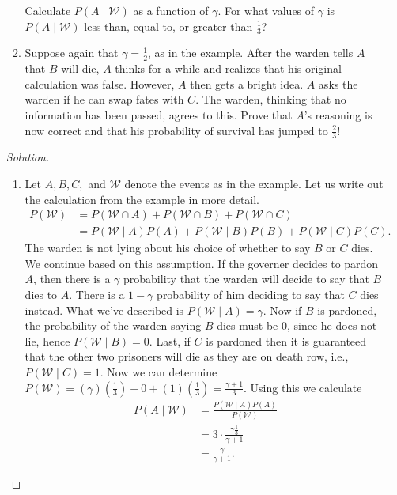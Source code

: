 \documentclass[12pt]{article}
\theoremstyle{definition}
\theoremstyle{plain}
\newenvironment{solution}
  {\begin{proof}[Solution]}
  {\end{proof}}
\begin{document}
\begin{enumerate}
\begin{enumerate}
	Calculate $ P(A \mid \mathcal{W}) $ as a function of $ \gamma $. For what values of $ \gamma$ is $ P(A \mid \mathcal{W}) $ less than, equal to, or greater than $ \frac{1}{3} $?
	
	\item Suppose again that $ \gamma = \frac{1}{2} $, as in the example. After the warden tells $ A $ that $ B $ will die, $ A $ thinks for a while and realizes that his original calculation was false. However, $ A $ then gets a bright idea. $ A $ asks the warden if he can swap fates with $ C $. The warden, thinking that no information has been passed, agrees to this. Prove that $ A $'s reasoning is now correct and that his probability of survival has jumped to $ \frac{2}{3} $!
	\end{enumerate}
	
\begin{solution}
\begin{enumerate}
\item Let $ A, B, C, $ and $ \mathcal{W} $ denote the events as in the example. Let us write out the calculation from the example in more detail.
\begin{align*}
	P(\mathcal{W}) &= P(\mathcal{W} \cap A) + P(\mathcal{W} \cap B) + P(\mathcal{W} \cap C)\\
	&= P(\mathcal{W} \mid A)P(A) + P(\mathcal{W}\mid B) P(B) + P(\mathcal{W} \mid C)P(C).
\end{align*}
The warden is not lying about his choice of whether to say $ B $ or $ C $ dies. We continue based on this assumption. If the governer decides to pardon $ A $, then there is a $ \gamma $ probability that the warden will decide to say that $ B $ dies to $ A $. There is a $ 1 - \gamma $ probability of him deciding to say that $ C $ dies instead. What we've described is $ P(\mathcal{W}\mid A) = \gamma $. Now if $ B $ is pardoned, the probability of the warden saying $ B $ dies must be $ 0 $, since he does not lie, hence $ P(\mathcal{W}\mid B) = 0 $. Last, if $ C $ is pardoned then it is guaranteed that the other two prisoners will die as they are on death row, i.e., $ P(\mathcal{W} \mid C) = 1 $. Now we can determine $ P(\mathcal{W}) = (\gamma) (\frac{1}{3}) + 0 + (1)(\frac{1}{3}) = \frac{\gamma + 1}{3}$. Using this we calculate
\begin{align*}
	P(A \mid \mathcal{W}) &= \frac{ P(\mathcal{W} \mid A) P(A)}{P(\mathcal{W})}\\
	&= 3 \cdot \frac{ \gamma \frac{1}{3} }{\gamma + 1}\\
	&= \frac{\gamma}{\gamma + 1}.

\end{align*}
\end{enumerate}
\end{solution}
\end{enumerate}
\end{document}
